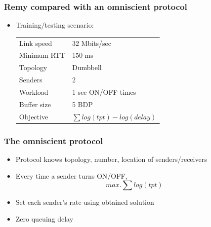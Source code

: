 \begin{frame}
\frametitle{Remy compared with an omniscient protocol}
\begin{itemize}
\item Training/testing scenario:
\begin{tabular}{p{}p{}}
Link speed & 32 Mbits/sec \\
Minimum RTT & 150 ms \\
Topology & Dumbbell \\
Senders & 2 \\
Workload & 1 sec ON/OFF times \\
Buffer size & 5 BDP \\
Objective & $\sum log(tpt) - log(delay)$
\end{tabular}
\end{itemize}
\end{frame}

\begin{frame}
\frametitle{The omniscient protocol}
\begin{itemize}
\item Protocol knows topology, number, location of senders/receivers  
\item Every time a sender turns ON/OFF,
      \begin{equation*}
      max. \sum log (tpt)
      \end{equation*}
\item Set each sender's rate using obtained solution
\item Zero queuing delay
\end{itemize}
\end{frame}

